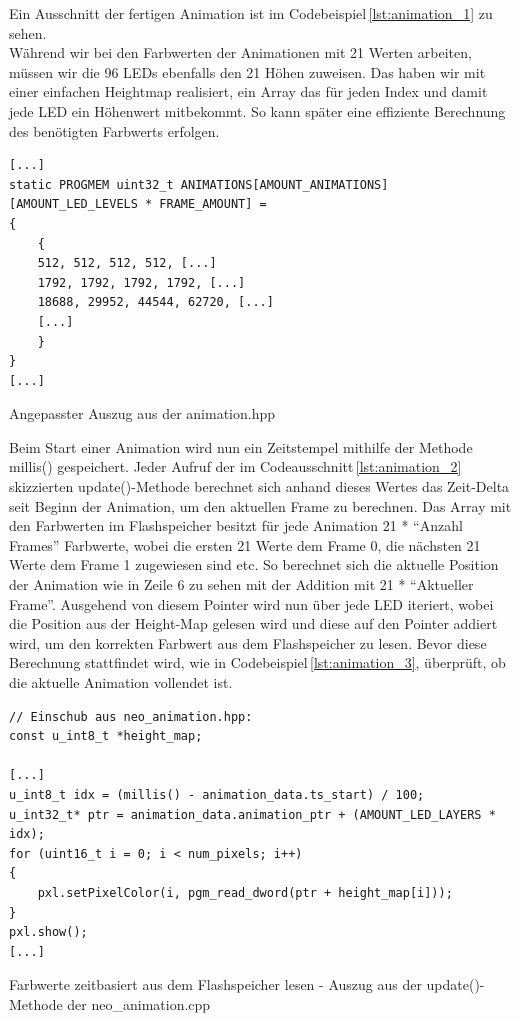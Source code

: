     Ein Ausschnitt der fertigen Animation ist im Codebeispiel\,\ref{lst:animation_1} zu sehen. \\

    Während wir bei den Farbwerten der Animationen mit 21 Werten arbeiten, müssen wir die 96 LEDs ebenfalls den 21 Höhen zuweisen.
    Das haben wir mit einer einfachen Heightmap realisiert, ein Array das für jeden Index und damit jede LED ein Höhenwert mitbekommt.
    So kann später eine effiziente Berechnung des benötigten Farbwerts erfolgen.\\


    \begin{listing}
        \begin{verbatim}
[...]
static PROGMEM uint32_t ANIMATIONS[AMOUNT_ANIMATIONS][AMOUNT_LED_LEVELS * FRAME_AMOUNT] = 
{
    {
    512, 512, 512, 512, [...]
    1792, 1792, 1792, 1792, [...]
    18688, 29952, 44544, 62720, [...]
    [...]
    }
}
[...]
        \end{verbatim}
        \caption{Angepasster Auszug aus der animation.hpp}
        \label{lst:animation_1}
    \end{listing}

    Beim Start einer Animation wird nun ein Zeitstempel mithilfe der Methode millis() gespeichert. Jeder Aufruf der im Codeausschnitt\,\ref{lst:animation_2} skizzierten update()-Methode berechnet sich anhand dieses Wertes das Zeit-Delta seit Beginn der Animation, um den aktuellen Frame zu berechnen. Das Array mit den Farbwerten im Flashspeicher besitzt für jede Animation 21 * \enquote{Anzahl Frames} Farbwerte, wobei die ersten 21 Werte dem Frame 0, die nächsten 21 Werte dem Frame 1 zugewiesen sind etc.
    So berechnet sich die aktuelle Position der Animation wie in Zeile 6 zu sehen mit der Addition mit 21 * \enquote{Aktueller Frame}.
    Ausgehend von diesem Pointer wird nun über jede LED iteriert, wobei die Position aus der Height-Map gelesen wird und diese auf den Pointer addiert wird, um den korrekten Farbwert aus dem Flashspeicher zu lesen.
    Bevor diese Berechnung stattfindet wird, wie in Codebeispiel\,\ref{lst:animation_3}, überprüft, ob die aktuelle Animation vollendet ist.

    \begin{listing}
        \begin{verbatim}
// Einschub aus neo_animation.hpp:
const u_int8_t *height_map;

[...]
u_int8_t idx = (millis() - animation_data.ts_start) / 100;
u_int32_t* ptr = animation_data.animation_ptr + (AMOUNT_LED_LAYERS * idx);
for (uint16_t i = 0; i < num_pixels; i++)
{
    pxl.setPixelColor(i, pgm_read_dword(ptr + height_map[i]));
}
pxl.show();
[...]

        \end{verbatim}
        \caption{Farbwerte zeitbasiert aus dem Flashspeicher lesen - Auszug aus der update()-Methode der neo\_animation.cpp}
        \label{lst:animation_2}
    \end{listing}

